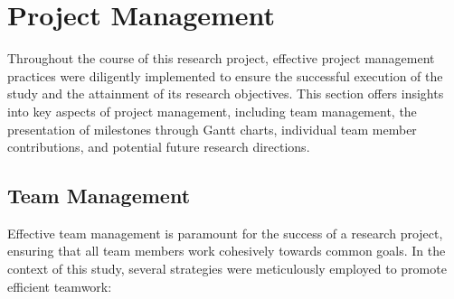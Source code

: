 \documentclass[conference]{IEEEtran}
\begin{document}
\section{Project Management}

Throughout the course of this research project, effective project management practices were diligently implemented to ensure the successful execution of the study and the attainment of its research objectives. This section offers insights into key aspects of project management, including team management, the presentation of milestones through Gantt charts, individual team member contributions, and potential future research directions.

\subsection{Team Management}
Effective team management is paramount for the success of a research project, ensuring that all team members work cohesively towards common goals. In the context of this study, several strategies were meticulously employed to promote efficient teamwork:
\end{document}
